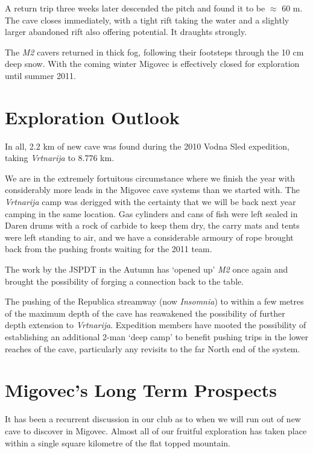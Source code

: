 A return trip three weeks later descended the pitch and found it to be
\(\approx\) 60 m. The cave closes immediately, with a tight rift taking
the water and a slightly larger abandoned rift also offering potential.
It draughts strongly.

The \emph{M2} cavers returned in thick fog, following their footsteps
through the 10 cm deep snow. With the coming winter Migovec is
effectively closed for exploration until summer 2011.

\hypertarget{exploration-outlook}{%
\section{Exploration Outlook}\label{exploration-outlook}}

In all, 2.2 km of new cave was found during the 2010 Vodna Sled
expedition, taking \emph{Vrtnarija} to 8.776 km.

We are in the extremely fortuitous circumstance where we finish the year
with considerably more leads in the Migovec cave systems than we started
with. The \emph{Vrtnarija} camp was derigged with the certainty that we
will be back next year camping in the same location. Gas cylinders and
cans of fish were left sealed in Daren drums with a rock of carbide to
keep them dry, the carry mats and tents were left standing to air, and
we have a considerable armoury of rope brought back from the pushing
fronts waiting for the 2011 team.

The work by the JSPDT in the Autumn has `opened up' \emph{M2} once again
and brought the possibility of forging a connection back to the table.

The pushing of the Republica streamway (now \emph{Insomnia}) to within a
few metres of the maximum depth of the cave has reawakened the
possibility of further depth extension to \emph{Vrtnarija}. Expedition
members have mooted the possibility of establishing an additional 2-man
`deep camp' to benefit pushing trips in the lower reaches of the cave,
particularly any revisits to the far North end of the system.

\hypertarget{migovecs-long-term-prospects}{%
\section{Migovec's Long Term
Prospects}\label{migovecs-long-term-prospects}}

It has been a recurrent discussion in our club as to when we will run
out of new cave to discover in Migovec. Almost all of our fruitful
exploration has taken place within a single square kilometre of the flat
topped mountain.

